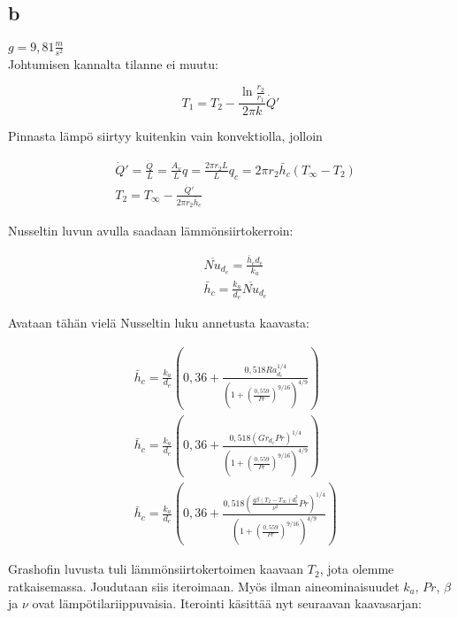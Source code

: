 \documentclass[12pt,a4paper,finnish]{article}
\begin{document}
\subsection{b}

\begin{math}
 g = 9,81 \frac{m}{s^2}
\end{math}\\

Johtumisen kannalta tilanne ei muutu:

\begin{equation}
 T_1 = T_2 - \frac{\ln \frac{r_2}{r_1}}{2\pi k}\dot{Q}'
\end{equation}

Pinnasta lämpö siirtyy kuitenkin vain konvektiolla, jolloin

\begin{align}
 &\dot{Q}' = \frac{\dot{Q}}{L} = \frac{A_v}{L}q = \frac{2\pi r_2L}{L}q_c = 2\pi r_2\bar{h}_c(T_{\infty} - T_2)\\
 &T_2 =  T_{\infty} - \frac{\dot{Q}'}{2\pi r_2\bar{h}_c}
\end{align}

Nusseltin luvun avulla saadaan lämmönsiirtokerroin:

\begin{align}
 &\overline{Nu}_{d_e} = \frac{\bar{h}_cd_e}{k_a}\\
 &\bar{h}_c = \frac{k_a}{d_e}\overline{Nu}_{d_e}
\end{align}

Avataan tähän vielä Nusseltin luku annetusta kaavasta:

\begin{align}
 &\bar{h}_c = \frac{k_a}{d_e}\left(0,36 + 
  \frac{0,518Ra_{d_e}^{1/4}}{\left(1 + \left(\frac{0,559}{Pr}\right)^{9/16}\right)^{4/9}}\right)\\
 &\bar{h}_c = \frac{k_a}{d_e}\left(0,36 + 
  \frac{0,518(Gr_{d_e}Pr)^{1/4}}{\left(1 + \left(\frac{0,559}{Pr}\right)^{9/16}\right)^{4/9}}\right)\\
 &\bar{h}_c = \frac{k_a}{d_e}\left(0,36 + 
  \frac{0,518\left(\frac{g\beta(T_2 - T_{\infty})d_e^3}{\nu^2}Pr\right)^{1/4}}
    {\left(1 + \left(\frac{0,559}{Pr}\right)^{9/16}\right)^{4/9}}\right)
\end{align}

Grashofin luvusta tuli lämmönsiirtokertoimen kaavaan $T_2$, jota olemme ratkaisemassa. Joudutaan siis iteroimaan.
Myös ilman aineominaisuudet $k_a$, $Pr$, $\beta$ ja $\nu$ ovat lämpötilariippuvaisia. 
Iterointi käsittää nyt seuraavan kaavasarjan:
\end{document}
